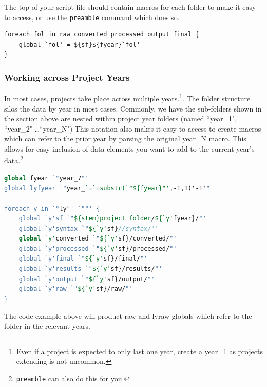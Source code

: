 \documentclass[11pt]{article}
\begin{document}
The top of your script file should contain macros for each folder to make it easy to access, or use the \texttt{preamble} command which does so.
\begin{lstlisting}
foreach fol in raw converted processed output final {
	global `fol' = ${sf}${fyear}`fol'
}
\end{lstlisting}

\subsubsection{Working across Project Years} In most cases, projects take place across multiple years.\footnote{Even if a project is expected to only last one year, create a year\_1 as projects extending is not uncommon.}. The folder structure silos the data by year in most cases. Commonly, we have the sub-folders shown in the section above are nested within project year folders (named ``year\_1", ``year\_2" \ldots ``year\_N")  This notation also makes it easy to access to create macros which can refer to the prior year by parsing the original year\_N macro. This allows for easy inclusion of data elements you want to add to the current year\rq{}s data.\footnote{\texttt{preamble} can also do this for you.}

\begin{lstlisting}[language=Stata, numbers=none]
global fyear `"year_7"'
global lyfyear `"year_`=`=substr(`"${fyear}"',-1,1)'-1'"'

foreach y in `"ly"' `""' {
	global `y'sf `"${stem}project_folder/${`y'fyear}/"'
	global `y'syntax `"${`y'sf}//syntax/"'
	global `y'converted `"${`y'sf}/converted/"'
	global `y'processed `"${`y'sf}/processed/"'
	global `y'final `"${`y'sf}/final/"'
	global `y'results `"${`y'sf}/results/"'
	global `y'output `"${`y'sf}/output/"'
	global `y'raw `"${`y'sf}/raw/"'
}
\end{lstlisting}

The code example above will product raw and lyraw globals which refer to the folder in the relevant years.
\end{document}

